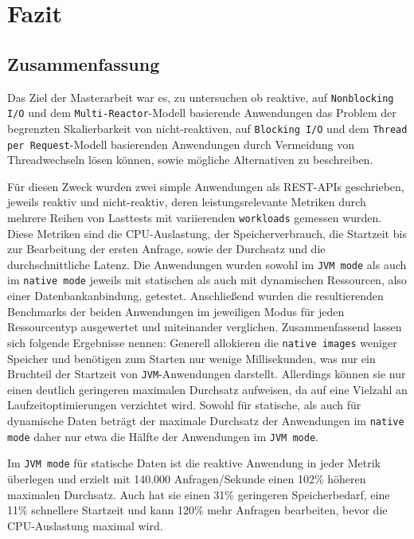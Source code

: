 \section{Fazit}
\label{sec:fazit}
\subsection{Zusammenfassung}
\label{subsec:zusammenfassung}
Das Ziel der Masterarbeit war es, zu untersuchen ob reaktive, auf \verb|Nonblocking I/O| und dem \verb|Multi-Reactor|-Modell basierende
Anwendungen das Problem der begrenzten Skalierbarkeit von nicht-reaktiven, auf \verb|Blocking I/O| und dem \verb|Thread per Request|-Modell
basierenden Anwendungen durch Vermeidung von Threadwechseln lösen können, sowie mögliche Alternativen zu beschreiben.

Für diesen Zweck wurden zwei simple Anwendungen als REST-APIs geschrieben, jeweils reaktiv und nicht-reaktiv, deren
leistungsrelevante Metriken durch mehrere Reihen von Lasttests mit variierenden \verb|workloads| gemessen wurden.
Diese Metriken sind die CPU-Auslastung, der Speicherverbrauch, die Startzeit bis zur Bearbeitung der ersten Anfrage,
sowie der Durchsatz und die durchschnittliche Latenz.
Die Anwendungen wurden sowohl im \verb|JVM mode| als auch im \verb|native mode| jeweils mit statischen als auch mit dynamischen
Ressourcen, also einer Datenbankanbindung, getestet.
Anschließend wurden die resultierenden Benchmarks der beiden Anwendungen im jeweiligen Modus für jeden Ressourcentyp ausgewertet und
miteinander verglichen.\newline
Zusammenfassend lassen sich folgende Ergebnisse nennen:\newline
Generell allokieren die \verb|native images| weniger Speicher und benötigen zum Starten nur wenige Millisekunden, was nur ein Bruchteil der Startzeit
von \verb|JVM|-Anwendungen darstellt. Allerdings können sie nur einen deutlich
geringeren maximalen Durchsatz aufweisen, da auf eine Vielzahl an Laufzeitoptimierungen verzichtet wird.
Sowohl für statische, als auch für dynamische Daten beträgt der maximale Durchsatz der Anwendungen im \verb|native mode|
daher nur etwa die Hälfte der Anwendungen im \verb|JVM mode|.

Im \verb|JVM mode| für statische Daten ist die reaktive Anwendung in jeder Metrik überlegen und erzielt mit 140.000 Anfragen/Sekunde
einen 102\% höheren maximalen Durchsatz.
Auch hat sie einen 31\% geringeren Speicherbedarf, eine 11\% schnellere Startzeit und kann 120\% mehr Anfragen bearbeiten,
bevor die CPU-Auslastung maximal wird.

